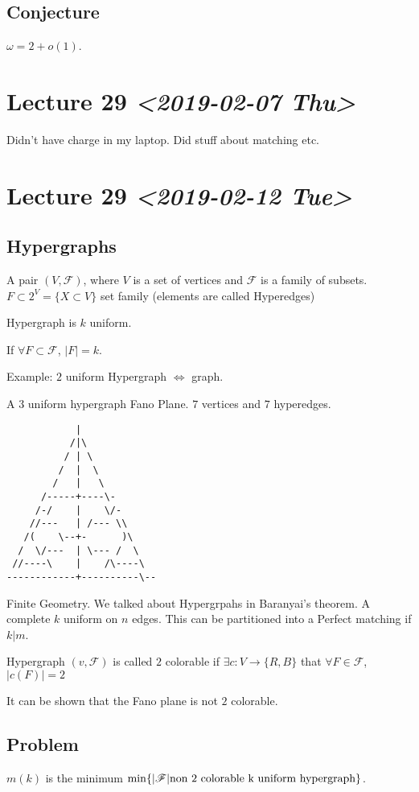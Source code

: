 \documentclass[11pt]{article}
\def\min{\operatorname{min}}
\begin{document}
\subsection{Conjecture}
\label{sec:org2b2f0fa}
\(\omega = 2 + o(1)\).
\section{Lecture 29 \textit{<2019-02-07 Thu>}}
\label{sec:orgc52736a}
Didn't have charge in my laptop. Did stuff about matching etc.
\section{Lecture 29 \textit{<2019-02-12 Tue>}}
\label{sec:orgf2cb4e4}
\subsection{Hypergraphs}
\label{sec:org1dd5eb3}
A pair \((V, \mathscr{F})\), where \(V\) is a set of vertices and \(\mathscr{F}\)
is a family of subsets. \(F \subset 2^V = \{X \subset V\}\) set family
(elements are called Hyperedges)

Hypergraph is \(k\) uniform.

If \(\forall F \subset \mathscr{F}\), \(\vert F \vert = k\).

Example: \(2\) uniform Hypergraph \(\iff\) graph.

A \(3\) uniform hypergraph Fano Plane. \(7\) vertices and \(7\) hyperedges.

\begin{verbatim}
            |
           /|\
          / | \
         /  |  \
        /   |   \
      /-----+----\-
     /-/    |    \/-
    //---   | /--- \\
   /(    \--+-      )\
  /  \/---  | \--- /  \
 //----\    |    /\----\
------------+----------\--
\end{verbatim}

Finite Geometry. We talked about Hypergrpahs in Baranyai's theorem. A
complete \(k\) uniform on \(n\) edges. This can be partitioned into a Perfect
matching if \(k \vert m\).

Hypergraph \((v, \mathscr{F})\) is called \(2\) colorable if \(\exists c \colon V
   \rightarrow \{R, B\}\) that \(\forall F \in \mathscr{F}\), \(\vert c(F) \vert =
   2\)

It can be shown that the Fano plane is not \(2\) colorable.
\subsection{Problem}
\label{sec:orgeaa9bac}
\(m(k)\) is the minimum \(\min \{ \vert \mathscr{F} \vert \textup{non 2
   colorable k uniform hypergraph} \}\).
\end{document}
